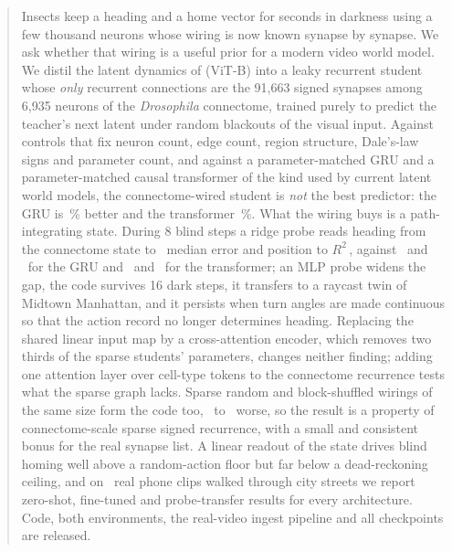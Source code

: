 \begin{abstract}
Insects keep a heading and a home vector for seconds in darkness using a few thousand neurons whose wiring is now known
synapse by synapse. We ask whether that wiring is a useful prior for a modern video world model. We distil the latent
dynamics of \vjepa (ViT-B) into a leaky recurrent student whose \emph{only} recurrent connections are the 91,663 signed
synapses among 6,935 neurons of the \flywire \emph{Drosophila} connectome, trained purely to predict the teacher's next
latent under random blackouts of the visual input. Against controls that fix neuron count, edge count, region structure,
Dale's-law signs and parameter count, and against a parameter-matched GRU and a parameter-matched causal transformer
of the kind used by current latent world models, the connectome-wired student is \emph{not} the best predictor: the
GRU is \nGruBetterArena\,\% better and the transformer \nTfBetterArena\,\%. What the wiring buys is a path-integrating
state. During 8 blind steps a ridge probe reads heading from the connectome state to \nConnArenaHd\degree\ median error
and position to $R^2$\,\nConnArenaPos, against \nGruArenaHd\degree\ and \nGruArenaPos\ for the GRU and
\nTfArenaHd\degree\ and \nTfArenaPos\ for the transformer; an MLP probe widens the gap, the code survives 16 dark
steps, it transfers to a raycast twin of Midtown Manhattan, and it persists when turn angles are made continuous so
that the action record no longer determines heading. Replacing the shared linear input map by a cross-attention
encoder, which removes two thirds of the sparse students' parameters, changes neither finding; adding one attention
layer over cell-type tokens to the connectome recurrence tests what the sparse graph lacks. Sparse random and
block-shuffled wirings of the same size form the code too, \nConnBlockGapArena\ to \nConnBlockGapArenaDarkSixteen\degree\ worse,
so the result is a property of connectome-scale sparse signed recurrence, with a small and consistent bonus for the
real synapse list. A linear readout of the state drives blind homing well above a random-action floor but far below a
dead-reckoning ceiling, and on \nRvClips\ real phone clips walked through city streets we report zero-shot,
fine-tuned and probe-transfer results for every architecture. Code, both environments, the real-video ingest pipeline
and all checkpoints are released.
\end{abstract}
